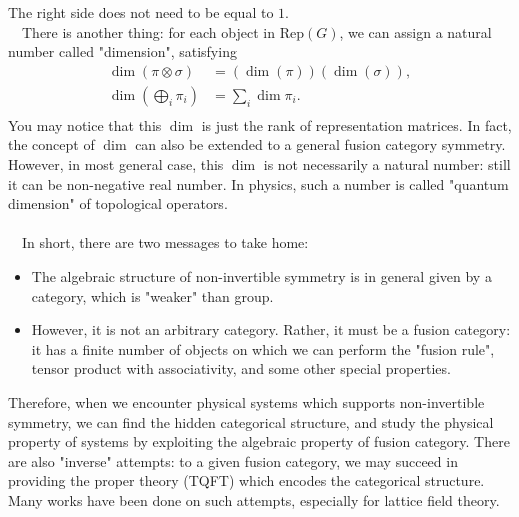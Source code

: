 \documentclass{ltjsarticle}
\theoremstyle{mystyle} %
\numberwithin{equation}{section}
\begin{document}
 The right side does not need to be equal to $1$. 
  \\
  　There is another thing: for each object in $\mathrm{Rep}(G)$, we can assign a natural number called "dimension", satisfying
  \begin{align}
    \dim{(\pi \otimes \sigma)} &= (\dim(\pi))(\dim(\sigma)), \\
    \dim(\bigoplus_i \pi_i) &= \sum_i \dim{\pi_i}. \\
  \label{dim}
  \end{align}
  You may notice that this $\dim$ is just the rank of representation matrices. 
  In fact, the concept of $\dim$ can also be extended to a general fusion category symmetry. 
  However, in most general case, this $\dim$ is not necessarily a natural number: still it can be non-negative real number. 
  In physics, such a number is called "quantum dimension" of topological operators. 
  \\
  \\
  　In short, there are two messages to take home: 
  \begin{itemize}
    \item The algebraic structure of non-invertible symmetry is in general given by a category, which is "weaker" than group. 
    \item However, it is not an arbitrary category. Rather, it must be a fusion category:
     it has a finite number of objects on which we can perform the "fusion rule", tensor product with associativity, and some other special properties. 
  \end{itemize}
Therefore, when we encounter physical systems which supports non-invertible symmetry, 
we can find the hidden categorical structure, and study the physical property of systems by exploiting the algebraic property of fusion category. 
There are also "inverse" attempts: to a given fusion category, we may succeed in providing the proper theory (TQFT) which encodes the categorical structure. 
Many works have been done on such attempts, especially for lattice field theory. 
\end{document}

